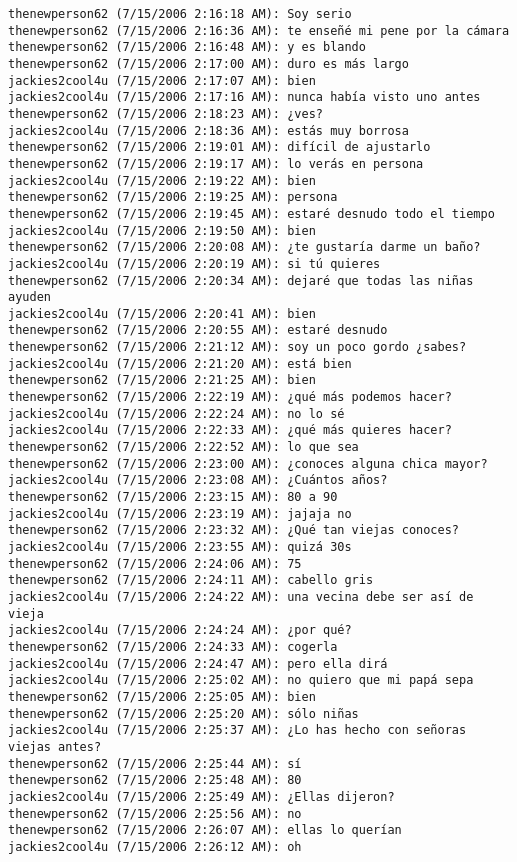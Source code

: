 \begin{verbatim}
thenewperson62 (7/15/2006 2:16:18 AM): Soy serio
thenewperson62 (7/15/2006 2:16:36 AM): te enseñé mi pene por la cámara
thenewperson62 (7/15/2006 2:16:48 AM): y es blando
thenewperson62 (7/15/2006 2:17:00 AM): duro es más largo
jackies2cool4u (7/15/2006 2:17:07 AM): bien
jackies2cool4u (7/15/2006 2:17:16 AM): nunca había visto uno antes
thenewperson62 (7/15/2006 2:18:23 AM): ¿ves?
jackies2cool4u (7/15/2006 2:18:36 AM): estás muy borrosa
thenewperson62 (7/15/2006 2:19:01 AM): difícil de ajustarlo
thenewperson62 (7/15/2006 2:19:17 AM): lo verás en persona
jackies2cool4u (7/15/2006 2:19:22 AM): bien
thenewperson62 (7/15/2006 2:19:25 AM): persona
thenewperson62 (7/15/2006 2:19:45 AM): estaré desnudo todo el tiempo
jackies2cool4u (7/15/2006 2:19:50 AM): bien
thenewperson62 (7/15/2006 2:20:08 AM): ¿te gustaría darme un baño?
jackies2cool4u (7/15/2006 2:20:19 AM): si tú quieres
thenewperson62 (7/15/2006 2:20:34 AM): dejaré que todas las niñas ayuden
jackies2cool4u (7/15/2006 2:20:41 AM): bien
thenewperson62 (7/15/2006 2:20:55 AM): estaré desnudo
thenewperson62 (7/15/2006 2:21:12 AM): soy un poco gordo ¿sabes?
jackies2cool4u (7/15/2006 2:21:20 AM): está bien
thenewperson62 (7/15/2006 2:21:25 AM): bien
thenewperson62 (7/15/2006 2:22:19 AM): ¿qué más podemos hacer?
jackies2cool4u (7/15/2006 2:22:24 AM): no lo sé
jackies2cool4u (7/15/2006 2:22:33 AM): ¿qué más quieres hacer?
thenewperson62 (7/15/2006 2:22:52 AM): lo que sea
thenewperson62 (7/15/2006 2:23:00 AM): ¿conoces alguna chica mayor?
jackies2cool4u (7/15/2006 2:23:08 AM): ¿Cuántos años?
thenewperson62 (7/15/2006 2:23:15 AM): 80 a 90
jackies2cool4u (7/15/2006 2:23:19 AM): jajaja no
thenewperson62 (7/15/2006 2:23:32 AM): ¿Qué tan viejas conoces?
jackies2cool4u (7/15/2006 2:23:55 AM): quizá 30s
thenewperson62 (7/15/2006 2:24:06 AM): 75
thenewperson62 (7/15/2006 2:24:11 AM): cabello gris
jackies2cool4u (7/15/2006 2:24:22 AM): una vecina debe ser así de vieja
jackies2cool4u (7/15/2006 2:24:24 AM): ¿por qué?
thenewperson62 (7/15/2006 2:24:33 AM): cogerla
jackies2cool4u (7/15/2006 2:24:47 AM): pero ella dirá
jackies2cool4u (7/15/2006 2:25:02 AM): no quiero que mi papá sepa
thenewperson62 (7/15/2006 2:25:05 AM): bien
thenewperson62 (7/15/2006 2:25:20 AM): sólo niñas
jackies2cool4u (7/15/2006 2:25:37 AM): ¿Lo has hecho con señoras viejas antes?
thenewperson62 (7/15/2006 2:25:44 AM): sí
thenewperson62 (7/15/2006 2:25:48 AM): 80
jackies2cool4u (7/15/2006 2:25:49 AM): ¿Ellas dijeron?
thenewperson62 (7/15/2006 2:25:56 AM): no
thenewperson62 (7/15/2006 2:26:07 AM): ellas lo querían
jackies2cool4u (7/15/2006 2:26:12 AM): oh

\end{verbatim}
